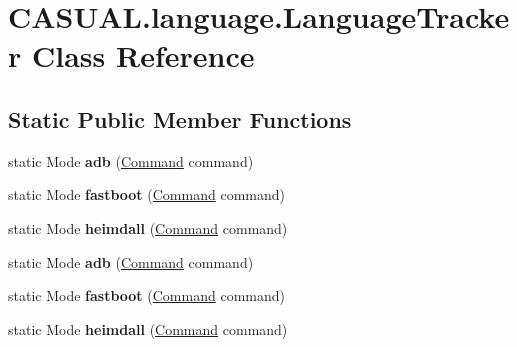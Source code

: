 \hypertarget{class_c_a_s_u_a_l_1_1language_1_1_language_tracker}{\section{C\-A\-S\-U\-A\-L.\-language.\-Language\-Tracker Class Reference}
\label{class_c_a_s_u_a_l_1_1language_1_1_language_tracker}
}
\subsection*{Static Public Member Functions}
\begin{DoxyCompactItemize}
\item 
\hypertarget{class_c_a_s_u_a_l_1_1language_1_1_language_tracker_a7fc8c8cf834be259e2c6387f03ff8532}{static Mode {\bfseries adb} (\hyperlink{class_c_a_s_u_a_l_1_1language_1_1_command}{Command} command)}\label{class_c_a_s_u_a_l_1_1language_1_1_language_tracker_a7fc8c8cf834be259e2c6387f03ff8532}

\item 
\hypertarget{class_c_a_s_u_a_l_1_1language_1_1_language_tracker_af684aa678d62ff6a8e1b65085db02838}{static Mode {\bfseries fastboot} (\hyperlink{class_c_a_s_u_a_l_1_1language_1_1_command}{Command} command)}\label{class_c_a_s_u_a_l_1_1language_1_1_language_tracker_af684aa678d62ff6a8e1b65085db02838}

\item 
\hypertarget{class_c_a_s_u_a_l_1_1language_1_1_language_tracker_ac9b1d84675bfbc8db48628153f08cefd}{static Mode {\bfseries heimdall} (\hyperlink{class_c_a_s_u_a_l_1_1language_1_1_command}{Command} command)}\label{class_c_a_s_u_a_l_1_1language_1_1_language_tracker_ac9b1d84675bfbc8db48628153f08cefd}

\item 
\hypertarget{class_c_a_s_u_a_l_1_1language_1_1_language_tracker_a7fc8c8cf834be259e2c6387f03ff8532}{static Mode {\bfseries adb} (\hyperlink{class_c_a_s_u_a_l_1_1language_1_1_command}{Command} command)}\label{class_c_a_s_u_a_l_1_1language_1_1_language_tracker_a7fc8c8cf834be259e2c6387f03ff8532}

\item 
\hypertarget{class_c_a_s_u_a_l_1_1language_1_1_language_tracker_af684aa678d62ff6a8e1b65085db02838}{static Mode {\bfseries fastboot} (\hyperlink{class_c_a_s_u_a_l_1_1language_1_1_command}{Command} command)}\label{class_c_a_s_u_a_l_1_1language_1_1_language_tracker_af684aa678d62ff6a8e1b65085db02838}

\item 
\hypertarget{class_c_a_s_u_a_l_1_1language_1_1_language_tracker_ac9b1d84675bfbc8db48628153f08cefd}{static Mode {\bfseries heimdall} (\hyperlink{class_c_a_s_u_a_l_1_1language_1_1_command}{Command} command)}\label{class_c_a_s_u_a_l_1_1language_1_1_language_tracker_ac9b1d84675bfbc8db48628153f08cefd}

\end{DoxyCompactItemize}


